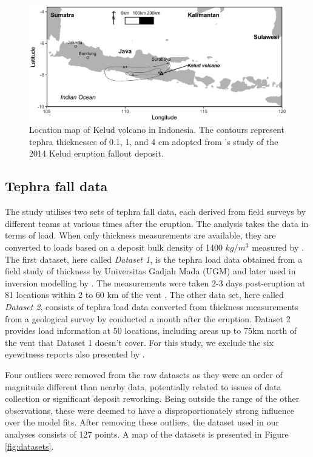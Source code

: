 \begin{figure}[htbp]
\centering
\includegraphics[width=\linewidth]{Figures/fig2_inset-map.png}
\caption{Location map of Kelud volcano in Indonesia. The contours represent tephra thicknesses of 0.1, 1, and 4 cm adopted from \cite{MAENO201924}'s study of the 2014 Kelud eruption fallout deposit.}
\label{fig:insetmap}
\end{figure}

\subsection{Tephra fall data}\label{subsection-case-data}

The study utilises two sets of tephra fall data, each derived from field surveys by different teams at various times after the eruption. The analysis takes the data in terms of load. When only thickness measurements are available, they are converted to loads based on a deposit bulk density of 1400 $kg/m^{3}$ measured by \cite{MAENO201924}. The first dataset, here called \textit{Dataset 1}, is the tephra load data obtained from a field study of thickness by Universitas Gadjah Mada (UGM) \citep{anggorowati2015} and later used in inversion modelling by \citet{williams2020}. The measurements were taken 2-3 days post-eruption at 81 locations within 2 to 60 km of the vent \citep{williams2020}. The other data set, here called \textit{Dataset 2}, consists of tephra load data converted from thickness measurements from a geological survey by \citet{MAENO201924} conducted a month after the eruption. Dataset 2 provides load information at 50 locations, including areas up to 75km north of the vent that Dataset 1 doesn't cover. For this study, we exclude the six eyewitness reports also presented by \citet{MAENO201924}.

Four outliers were removed from the raw datasets as they were an order of magnitude different than nearby data, potentially related to issues of data collection or significant deposit reworking. Being outside the range of the other observations, these were deemed to have a disproportionately strong influence over the model fits. After removing these outliers, the dataset used in our analyses consists of 127 points. A map of the datasets is presented in Figure \ref{fig:datasets}.


